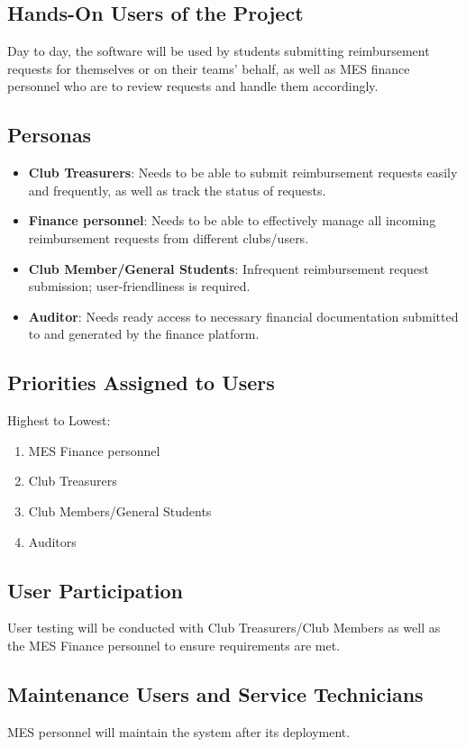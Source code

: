\documentclass[12pt]{article}
\begin{document}
\subsection{Hands-On Users of the Project}
Day to day, the software will be used by students submitting reimbursement requests for themselves or on their teams' behalf, as well as MES finance personnel who are to review requests and handle them accordingly.

\subsection{Personas}
\begin{itemize}
    \item \textbf{Club Treasurers}: Needs to be able to submit reimbursement requests easily and frequently, as well as track the status of requests.
    \item \textbf{Finance personnel}: Needs to be able to effectively manage all incoming reimbursement requests from different clubs/users.
    \item \textbf{Club Member/General Students}: Infrequent reimbursement request submission; user-friendliness is required.
    \item \textbf{Auditor}: Needs ready access to necessary financial documentation submitted to and generated by the finance platform.
\end{itemize}

\subsection{Priorities Assigned to Users}
Highest to Lowest:
\begin{enumerate}
    \item MES Finance personnel
    \item Club Treasurers
    \item Club Members/General Students
    \item Auditors
\end{enumerate}

\subsection{User Participation}
User testing will be conducted with Club Treasurers/Club Members as well as the MES Finance personnel to ensure requirements are met.

\subsection{Maintenance Users and Service Technicians}
MES personnel will maintain the system after its deployment.
\end{document}
